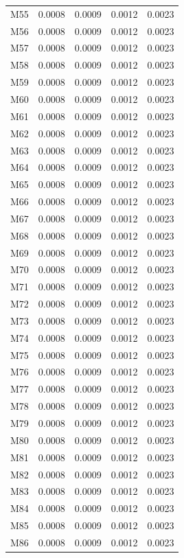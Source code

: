 \begin{longtable}{lrrrr}
M55 & 0.0008 & 0.0009 & 0.0012 & 0.0023 \\
M56 & 0.0008 & 0.0009 & 0.0012 & 0.0023 \\
M57 & 0.0008 & 0.0009 & 0.0012 & 0.0023 \\
M58 & 0.0008 & 0.0009 & 0.0012 & 0.0023 \\
M59 & 0.0008 & 0.0009 & 0.0012 & 0.0023 \\
M60 & 0.0008 & 0.0009 & 0.0012 & 0.0023 \\
M61 & 0.0008 & 0.0009 & 0.0012 & 0.0023 \\
M62 & 0.0008 & 0.0009 & 0.0012 & 0.0023 \\
M63 & 0.0008 & 0.0009 & 0.0012 & 0.0023 \\
M64 & 0.0008 & 0.0009 & 0.0012 & 0.0023 \\
M65 & 0.0008 & 0.0009 & 0.0012 & 0.0023 \\
M66 & 0.0008 & 0.0009 & 0.0012 & 0.0023 \\
M67 & 0.0008 & 0.0009 & 0.0012 & 0.0023 \\
M68 & 0.0008 & 0.0009 & 0.0012 & 0.0023 \\
M69 & 0.0008 & 0.0009 & 0.0012 & 0.0023 \\
M70 & 0.0008 & 0.0009 & 0.0012 & 0.0023 \\
M71 & 0.0008 & 0.0009 & 0.0012 & 0.0023 \\
M72 & 0.0008 & 0.0009 & 0.0012 & 0.0023 \\
M73 & 0.0008 & 0.0009 & 0.0012 & 0.0023 \\
M74 & 0.0008 & 0.0009 & 0.0012 & 0.0023 \\
M75 & 0.0008 & 0.0009 & 0.0012 & 0.0023 \\
M76 & 0.0008 & 0.0009 & 0.0012 & 0.0023 \\
M77 & 0.0008 & 0.0009 & 0.0012 & 0.0023 \\
M78 & 0.0008 & 0.0009 & 0.0012 & 0.0023 \\
M79 & 0.0008 & 0.0009 & 0.0012 & 0.0023 \\
M80 & 0.0008 & 0.0009 & 0.0012 & 0.0023 \\
M81 & 0.0008 & 0.0009 & 0.0012 & 0.0023 \\
M82 & 0.0008 & 0.0009 & 0.0012 & 0.0023 \\
M83 & 0.0008 & 0.0009 & 0.0012 & 0.0023 \\
M84 & 0.0008 & 0.0009 & 0.0012 & 0.0023 \\
M85 & 0.0008 & 0.0009 & 0.0012 & 0.0023 \\
M86 & 0.0008 & 0.0009 & 0.0012 & 0.0023 \\

\end{longtable}
